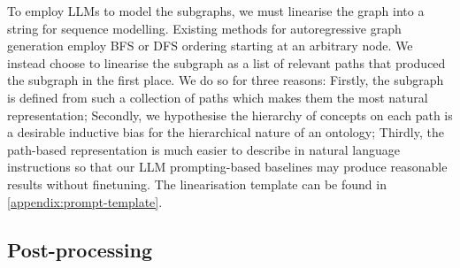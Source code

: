 To employ LLMs to model the subgraphs, we must linearise the graph into a string for sequence modelling. Existing methods for autoregressive graph generation employ BFS \cite{you2018graphrnn} or DFS \cite{goyal2020graphgen} ordering starting at an arbitrary node. We instead choose to linearise the subgraph as a list of relevant paths that produced the subgraph in the first place. We do so for three reasons: Firstly, the subgraph is defined from such a collection of paths which makes them the most natural representation; Secondly, we hypothesise the hierarchy of concepts on each path is a desirable inductive bias for the hierarchical nature of an ontology; Thirdly, the path-based representation is much easier to describe in natural language instructions so that our LLM prompting-based baselines may produce reasonable results without finetuning. The linearisation template can be found in \cref{appendix:prompt-template}.


\subsection{Post-processing}  \label{sec:method:post-processing}

